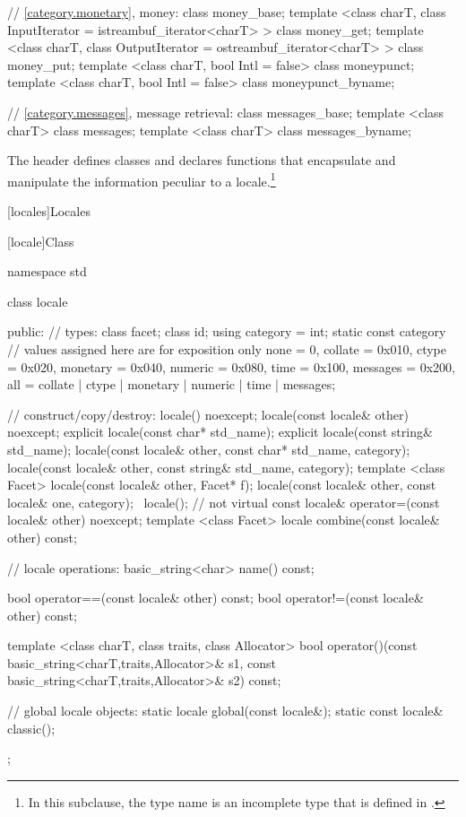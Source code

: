 \begin{codeblock}
{  // \ref{category.monetary}, money:
  class money_base;
  template <class charT, class InputIterator = istreambuf_iterator<charT> >  class money_get;
  template <class charT, class OutputIterator = ostreambuf_iterator<charT> > class money_put;
  template <class charT, bool Intl = false> class moneypunct;
  template <class charT, bool Intl = false> class moneypunct_byname;

  // \ref{category.messages}, message retrieval:
  class messages_base;
  template <class charT> class messages;
  template <class charT> class messages_byname;
}
\end{codeblock}

\pnum
The header
defines classes and declares functions that encapsulate and manipulate
the information peculiar to a locale.\footnote{In this subclause, the type name
is an incomplete type that is defined in
%
.}

[locales]{Locales}

[locale]{Class }

%
\begin{codeblock}
namespace std {
  class locale {
  public:
    // types:
    class facet;
    class id;
    using category = int;
    static const category   // values assigned here are for exposition only
      none     = 0,
      collate  = 0x010, ctype    = 0x020,
      monetary = 0x040, numeric  = 0x080,
      time     = 0x100, messages = 0x200,
      all = collate | ctype | monetary | numeric | time  | messages;

    // construct/copy/destroy:
    locale() noexcept;
    locale(const locale& other) noexcept;
    explicit locale(const char* std_name);
    explicit locale(const string& std_name);
    locale(const locale& other, const char* std_name, category);
    locale(const locale& other, const string& std_name, category);
    template <class Facet> locale(const locale& other, Facet* f);
    locale(const locale& other, const locale& one, category);
    ~locale();                  // not virtual
    const locale& operator=(const locale& other) noexcept;
    template <class Facet> locale combine(const locale& other) const;

    // locale operations:
    basic_string<char>                  name() const;

    bool operator==(const locale& other) const;
    bool operator!=(const locale& other) const;

    template <class charT, class traits, class Allocator>
      bool operator()(const basic_string<charT,traits,Allocator>& s1,
                      const basic_string<charT,traits,Allocator>& s2) const;

    // global locale objects:
    static       locale  global(const locale&);
    static const locale& classic();
  };
}
\end{codeblock}

